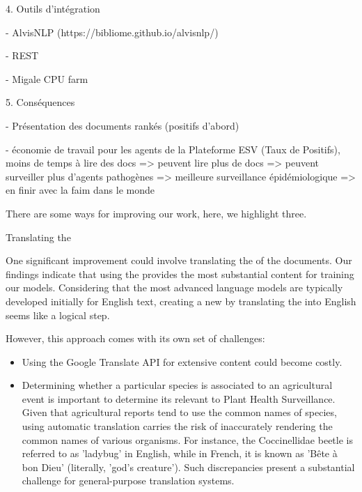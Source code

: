 4. Outils d'intégration

    - AlvisNLP (https://bibliome.github.io/alvisnlp/)

    - REST

    - Migale CPU farm


5. Conséquences

    - Présentation des documents rankés (positifs d'abord)

    - économie de travail pour les agents de la Plateforme ESV (Taux de Positifs), moins de temps à lire des docs => peuvent lire plus de docs => peuvent surveiller plus d'agents pathogènes => meilleure surveillance épidémiologique => en finir avec la faim dans le monde





\fi



\label{08_future_work}

There are some ways for improving our work, here, we highlight three. 




\begin{paragraph}{Translating the \trafilaturaFulltext{} }

One significant improvement could involve translating the \trafilaturaFulltext{} of the documents. Our findings indicate that using the \trafilaturaFulltext{} provides the most substantial content for training our models. Considering that the most advanced language models are typically developed initially for English text, creating a new \contentType{} by translating the \trafilaturaFulltext{} into English seems like a logical step.

However, this approach comes with its own set of challenges:

\begin{itemize}
    \item Using the Google Translate API for extensive content could become costly.
    \item Determining whether a particular species is associated to an agricultural event is important to determine its relevant to Plant Health Surveillance. 
    Given that agricultural reports tend to use the common names of species, using automatic translation carries the risk of inaccurately rendering the common names of various organisms. For instance, the Coccinellidae beetle is referred to as 'ladybug' in English, while in French, it is known as 'B\^ete \`a bon Dieu' (literally, 'god’s creature'). Such discrepancies present a substantial challenge for general-purpose translation systems.
\end{itemize}

\end{paragraph}



